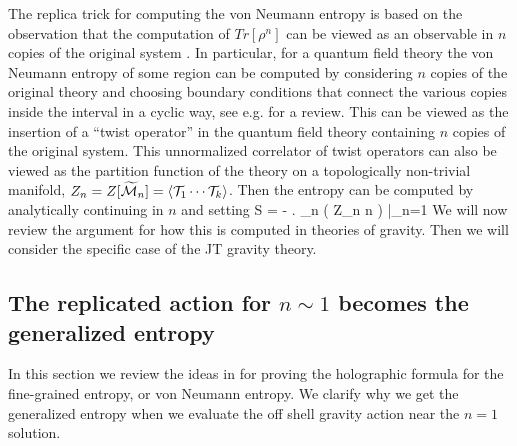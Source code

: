 \label{sec:Action}

The replica trick   for computing the von Neumann entropy is based on the observation that the computation of $Tr[\rho^n]$ can be viewed as an observable in $n$ copies of the original system \cite{Callan:1994py}. In particular, for a quantum field theory the von Neumann entropy 
of some region can be computed by considering $n$ copies of the original theory and choosing boundary conditions that connect the various copies inside the interval in a cyclic way, see e.g. \cite{Casini:2009sr} for a review.
This can be viewed as the insertion of a ``twist operator'' in the quantum field theory containing $n$ copies of the original system. 
This unnormalized correlator of twist operators can also be viewed as the partition function of the theory on a topologically non-trivial manifold, $Z_n =Z[\widetilde { \cal M}_n] = 
\langle {\cal T}_1 \cdots {\cal T}_k \rangle$. 
Then the entropy can be computed by analytically continuing in $n$  and 
setting   
\be
 S = - \left. \partial_n \left( { \log Z_n \over n} \right) \right|_{n=1} 
 \ee
 We will now review the argument for how this is computed in theories of gravity. Then we will consider the specific case of the JT gravity theory. 


\subsection{The replicated action for  $n\sim 1$ becomes the generalized entropy}
 
 

In this section we review the ideas in \cite{Lewkowycz:2013nqa,Faulkner:2013ana,Dong:2016hjy,Dong:2017xht} for proving the 
holographic formula for the fine-grained entropy, or von Neumann entropy. 
We clarify why we get the generalized entropy when we evaluate the off shell 
gravity action near the $n=1$ solution. 

